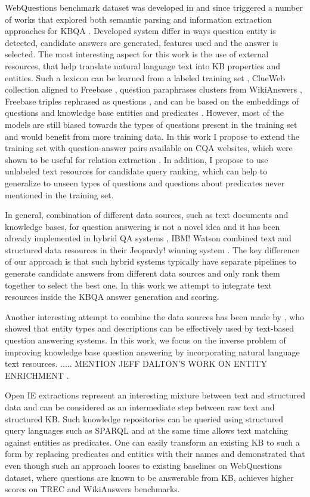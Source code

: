 WebQuestions benchmark dataset was developed in \cite{Berant:EMNLP13} and since triggered a number of works that explored both semantic parsing and information extraction approaches for KBQA \cite{yao2014freebase}.
Developed system differ in ways question entity is detected, candidate answers are generated, features used and the answer is selected.
The most interesting aspect for this work is the use of external resources, that help translate natural language text into KB properties and entities.
Such a lexicon can be learned from a labeled training set \cite{Berant:EMNLP13},  ClueWeb collection aligned to Freebase \cite{yao2014information}, question paraphrases clusters from WikiAnswers \cite{berant2014semantic}, Freebase triples rephrased as questions \cite{BordesCW14:emnlp}, and can be based on the embeddings of questions and knowledge base entities and predicates \cite{BordesCW14:emnlp,yih2015semantic}.
However, most of the models are still biased towards the types of questions present in the training set and would benefit from more training data.
In this work I propose to extend the training set with question-answer pairs available on CQA websites, which were shown to be useful for relation extraction \cite{savenkov-EtAl:2015:SRW}.
In addition, I propose to use unlabeled text resources for candidate query ranking, which can help to generalize to unseen types of questions and questions about predicates never mentioned in the training set.

In general, combination of different data sources, such as text documents and knowledge bases, for question answering is not a novel idea and it has been already implemented in hybrid QA systems \cite{baudivs2015modeling}, \eg IBM! Watson combined text and structured data resources in their Jeopardy! winning system \cite{Barker12}.
The key difference of our approach is that such hybrid systems typically have separate pipelines to generate candidate answers from different data sources and only rank them together to select the best one.
In this work we attempt to integrate text resources inside the KBQA answer generation and scoring.

Another interesting attempt to combine the data sources has been made by  \cite{Sun:2015:ODQ:2736277.2741651}, who showed that entity types and descriptions can be effectively used by text-based question answering systems.
In this work, we focus on the inverse problem of improving knowledge base question answering by incorporating natural language text resources.
..... MENTION JEFF DALTON'S WORK ON ENTITY ENRICHMENT \cite{dalton2014entity}.

Open IE extractions \cite{fader2011identifying} represent an interesting mixture between text and structured data and can be considered as an intermediate step between raw text and structured KB.
Such knowledge repositories can be queried using structured query languages such as SPARQL and at the same time allows text matching against entities as predicates.
One can easily transform an existing KB to such a form by replacing predicates and entities with their names and  \cite{Fader:2014:OQA:2623330.2623677} demonstrated that even though such an approach looses to existing baselines on WebQuestions dataset, where questions are known to be answerable from KB, achieves higher scores on TREC and WikiAnswers benchmarks.
